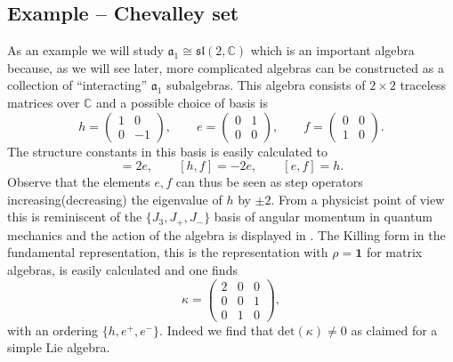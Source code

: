 \subsection{Example -- Chevalley set}
As an example we will study $\mathfrak{a}_1\cong\mathfrak{sl}(2,\mathbb{C})$ which is an important algebra because, as we will see later, more complicated algebras can be constructed as a collection of ``interacting'' $\mathfrak{a}_1$ subalgebras. This algebra consists of $2\times 2$ traceless matrices over $\mathbb{C}$ and a possible choice of basis is
\begin{equation}
    h=\begin{pmatrix}1&0\\0 &-1\end{pmatrix},\qquad e=\begin{pmatrix}0&1\\0 &0\end{pmatrix},\qquad f=\begin{pmatrix}0&0\\1 &0\end{pmatrix}.
\end{equation}
The structure constants in this basis is easily calculated to
\begin{equation}
    [h,e] = 2e,\qquad [h,f]=-2e, \qquad [e,f]=h.
\end{equation}
Observe that the elements $e,f$ can thus be seen as step operators increasing(decreasing) the eigenvalue of $h$ by $\pm 2$. From a physicist point of view this is reminiscent of the $\{J_3,J_+,J_-\}$ basis of angular momentum in quantum mechanics and the action of the algebra is displayed in . The Killing form in the fundamental representation, this is the representation with $\rho =\mathbf{1}$ for matrix algebras, is easily calculated and one finds 
\begin{equation}
    \kappa = \begin{pmatrix}2&0&0\\0&0&1\\0&1&0\end{pmatrix},
\end{equation}
with an ordering $\{h,e^+,e^-\}$. Indeed we find that $\text{det}(\kappa)\neq 0$ as claimed for a simple Lie algebra.

